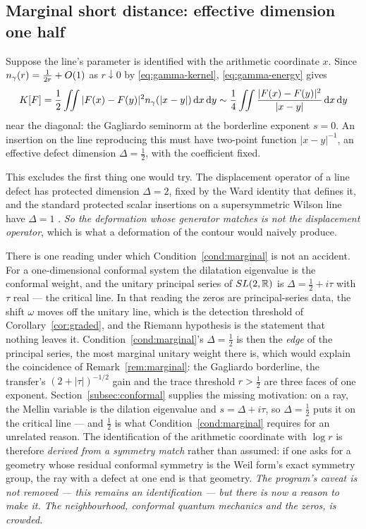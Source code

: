 \subsection{Marginal short distance: effective dimension one half}

\begin{condition}[Marginality]\label{cond:marginal}
Suppose the line's parameter is identified with the arithmetic coordinate $x$.
Since $n_{\gamma}(r)=\frac1{2r}+O(1)$ as $r\downarrow0$ by \eqref{eq:gamma-kernel},
\eqref{eq:gamma-energy} gives
\[
 K[F]=\frac12\iint|F(x)-F(y)|^2n_{\gamma}(|x-y|)\,\mathrm d x\,\mathrm d y
 \sim\frac14\iint\frac{|F(x)-F(y)|^2}{|x-y|}\,\mathrm d x\,\mathrm d y
\]
near the diagonal: the Gagliardo seminorm at the borderline exponent $s=0$. An
insertion on the line reproducing this must have two-point function $|x-y|^{-1}$,
an effective defect dimension $\Delta=\frac12$, with the coefficient fixed.
\end{condition}

This excludes the first thing one would try. The displacement operator of a line
defect has protected dimension $\Delta=2$, fixed by the Ward identity that defines
it, and the standard protected scalar insertions on a supersymmetric Wilson line
have $\Delta=1$ \cite{GiombiKomatsu,CHMS}. \emph{So the deformation whose
generator matches is not the displacement operator}, which is what a deformation
of the contour would naively produce.

\begin{remark}
\label{rem:principal}
There is one reading under which Condition~\ref{cond:marginal} is not an accident.
For a one-dimensional conformal system the dilatation eigenvalue is the conformal
weight, and the unitary principal series of $SL(2,\mathbb R)$ is $\Delta=\frac12+i\tau$
with $\tau$ real --- the critical line. In that reading the zeros are
principal-series data, the shift $\omega$ moves off the unitary line, which is the
detection threshold of Corollary~\ref{cor:graded}, and the Riemann hypothesis is
the statement that nothing leaves it. Condition~\ref{cond:marginal}'s
$\Delta=\frac12$ is then the \emph{edge} of the principal series, the most
marginal unitary weight there is, which would explain the coincidence of
Remark~\ref{rem:marginal}: the Gagliardo borderline, the transfer's
$(2+|\tau|)^{-1/2}$ gain and the trace threshold $r>\frac12$ are three faces of
one exponent. Section~\ref{subsec:conformal} supplies the missing motivation: on a ray, the
Mellin variable is the dilation eigenvalue and $s=\Delta+i\tau$, so
$\Delta=\frac12$ puts it on the critical line --- and $\frac12$ is what
Condition~\ref{cond:marginal} requires for an unrelated reason. The identification
of the arithmetic coordinate with $\log r$ is therefore \emph{derived from a
symmetry match} rather than assumed: if one asks for a geometry whose residual
conformal symmetry is the Weil form's exact symmetry group, the ray with a defect
at one end is that geometry. \emph{The program's caveat is not removed --- this
remains an identification --- but there is now a reason to make it. The
neighbourhood, conformal quantum mechanics and the zeros, is crowded.}
\end{remark}

